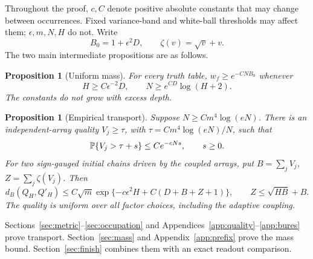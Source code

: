 \documentclass[11pt]{article}
\newtheorem{proposition}[theorem]{Proposition}\newtheorem{corollary}[theorem]{Corollary}
\begin{document}
Throughout the proof, $c,C$ denote positive absolute constants that may change between occurrences. Fixed variance-band and white-ball thresholds may affect them; $\epsilon,m,N,H$ do not. Write
\begin{equation}\label{eq:Bzero}
 B_0=1+\epsilon^2D,\qquad \zeta(v)=\sqrt v+v.
\end{equation}
The two main intermediate propositions are as follows.

\begin{proposition}[Uniform mass]\label{prop:mass}
For every truth table, $w_f\ge e^{-C N B_0}$ whenever
\begin{equation}\label{eq:massconditions}
 H\ge C\epsilon^{-2}D,\qquad N\ge e^{CD}\log(H+2).
\end{equation}
The constants do not grow with excess depth.
\end{proposition}

\begin{proposition}[Empirical transport]\label{prop:transport}
Suppose $N\ge Cm^4\log(eN)$. There is an independent-array quality $V_j\ge\tau$, with $\tau=Cm^4\log(eN)/N$, such that
\begin{equation}\label{eq:tail}
 \mathbb P\{V_j>\tau+s\}\le C e^{-cNs},\qquad s\ge0.
\end{equation}
For two sign-gauged initial chains driven by the coupled arrays, put $B=\sum_jV_j$, $Z=\sum_j\zeta(V_j)$. Then
\begin{equation}\label{eq:transport}
 d_B(Q_H,Q'_H)\le C\sqrt m\exp\{-c\epsilon^2H+C(D+B+Z+1)\},
 \qquad Z\le\sqrt{HB}+B.
\end{equation}
The quality is uniform over all factor choices, including the adaptive coupling.
\end{proposition}

Sections~\ref{sec:metric}--\ref{sec:occupation} and Appendices~\ref{app:quality}--\ref{app:bures} prove transport. Section~\ref{sec:mass} and Appendix~\ref{app:prefix} prove the mass bound. Section~\ref{sec:finish} combines them with an exact readout comparison.
\end{document}
